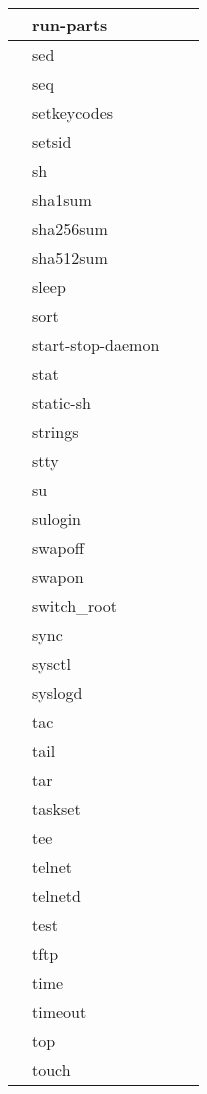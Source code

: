 \begin{longtable}{llp{120mm}p{120mm}}
     \hline
      & run-parts \\
     \hline
      & sed \\
     \hline
      & seq \\
     \hline
      & setkeycodes \\
     \hline
      & setsid \\
     \hline
      & sh \\
     \hline
      & sha1sum \\
     \hline
      & sha256sum \\
     \hline
      & sha512sum \\
     \hline
      & sleep \\
     \hline
      & sort \\
     \hline
      & start-stop-daemon \\
     \hline
      & stat \\
     \hline
      & static-sh \\
     \hline
      & strings \\
     \hline
      & stty \\
     \hline
      & su \\
     \hline
      & sulogin \\
     \hline
      & swapoff \\
     \hline
      & swapon \\
     \hline
      & switch\_root \\
     \hline
      & sync \\
     \hline
      & sysctl \\
     \hline
      & syslogd \\
     \hline
      & tac \\
     \hline
      & tail \\
     \hline
      & tar \\
     \hline
      & taskset \\
     \hline
      & tee \\
     \hline
      & telnet \\
     \hline
      & telnetd \\
     \hline
      & test \\
     \hline
      & tftp \\
     \hline
      & time \\
     \hline
      & timeout \\
     \hline
      & top \\
     \hline
      & touch \\
     \hline

\end{longtable}
